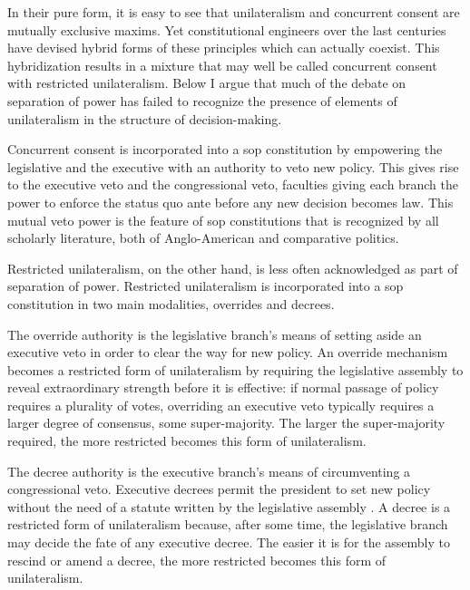In their pure form, it is easy to see that unilateralism and concurrent consent are mutually exclusive maxims.  Yet constitutional engineers over the last centuries have devised hybrid forms of these principles which can actually coexist.  This hybridization results in a mixture that may well be called concurrent consent with restricted unilateralism.  Below I argue that much of the debate on separation of power has failed to recognize the presence of elements of unilateralism in the structure of decision-making.  

Concurrent consent is incorporated into a sop constitution by empowering the legislative and the executive with an authority to veto new policy.  This gives rise to the executive veto and the congressional veto, faculties giving each branch the power to enforce the status quo ante before any new decision becomes law.  This mutual veto power is the feature of sop constitutions that is recognized by all scholarly literature, both of Anglo-American and comparative politics.  

Restricted unilateralism, on the other hand, is less often acknowledged as part of separation of power.  Restricted unilateralism is incorporated into a sop constitution in two main modalities, overrides and decrees.  

The override authority is the legislative branch's means of setting aside an executive veto in order to clear the way for new policy.  An override mechanism becomes a restricted form of unilateralism by requiring the legislative assembly to reveal extraordinary strength before it is effective: if normal passage of policy requires a plurality of votes, overriding an executive veto typically requires a larger degree of consensus, some super-majority.  The larger the super-majority required, the more restricted becomes this form of unilateralism.  

The decree authority is the executive branch's means of circumventing a congressional veto.  Executive decrees permit the president to set new policy without the need of a statute written by the legislative assembly \citep[9]{carey.shugart.1998}.  A decree is a restricted form of unilateralism because, after some time, the legislative branch may decide the fate of any executive decree.  The easier it is for the assembly to rescind or amend a decree, the more restricted becomes this form of unilateralism.  

